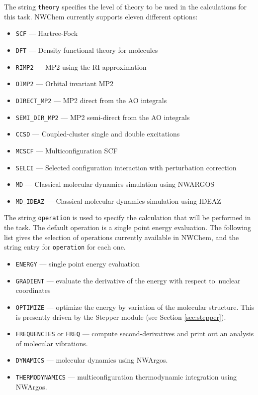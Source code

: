 The string \verb+theory+ specifies the level of theory to be used in the
calculations for this task.  NWChem currently supports eleven different
options:
\begin{itemize}
 \item \verb+SCF+ --- Hartree-Fock
 \item \verb+DFT+ --- Density functional theory for molecules
 \item \verb+RIMP2+ --- MP2 using the RI approximation
 \item \verb+OIMP2+ --- Orbital invariant MP2
 \item \verb+DIRECT_MP2+ --- MP2 direct from the AO integrals
 \item \verb+SEMI_DIR_MP2+ --- MP2 semi-direct from the AO integrals
 \item \verb+CCSD+ --- Coupled-cluster single and double excitations
 \item \verb+MCSCF+ --- Multiconfiguration SCF
 \item \verb+SELCI+ --- Selected configuration interaction with perturbation
   correction 
 \item \verb+MD+ --- Classical molecular dynamics simulation using NWARGOS
 \item \verb+MD_IDEAZ+ --- Classical molecular dynamics simulation
   using IDEAZ
\end{itemize}

The string \verb+operation+ is used to specify the calculation that will
be performed in the task.  The default operation is a single point energy
evaluation.  The following list gives the selection of operations currently
available in NWChem, and the string entry for \verb+operation+ for each one.
\begin{itemize}
 \item \verb+ENERGY+ --- single point energy evaluation
 \item \verb+GRADIENT+ --- evaluate the derivative of the energy with respect to\
   nuclear coordinates
 \item \verb+OPTIMIZE+ --- optimize the energy by variation of the molecular
   structure.  This is presently driven by the Stepper module
   (see Section \ref{sec:stepper}). 
 \item \verb+FREQUENCIES+ or \verb+FREQ+ --- compute second-derivatives and print
   out an analysis of molecular vibrations.
 \item \verb+DYNAMICS+ --- molecular dynamics using NWArgos.
 \item \verb+THERMODYNAMICS+ --- multiconfiguration thermodynamic integration
    using NWArgos.
\end{itemize}

